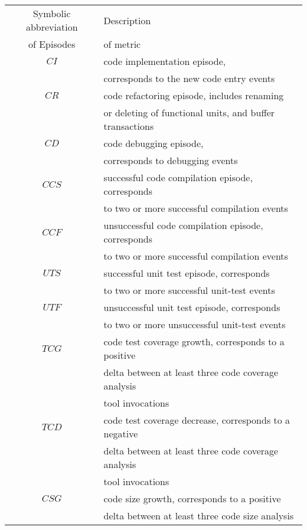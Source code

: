 \begin{table}
\begin{center}
    \begin{tabular}{ | c | l | }
    \hline
    Symbolic abbreviation 	& Description \\ 
    of Episodes 						& of metric	  \\ 
    \hline
    $CI$ 									& code implementation episode, \\ 
    											& corresponds to the new code entry events \\
	  \hline
    $CR$ 									& code refactoring episode, includes renaming \\
    											& or deleting of functional units, and buffer transactions \\
    \hline
    $CD$ 									& code debugging episode, \\
    											& corresponds to debugging events \\
		\hline
		$CCS$ 								& successful code compilation episode, corresponds \\
													& to two or more successful compilation events \\
		\hline
		$CCF$ 								& unsuccessful code compilation episode, corresponds \\
													& to two or more successful compilation events \\
    \hline
		$UTS$ 								& successful unit test episode, corresponds \\
													& to two or more successful unit-test events \\
		\hline
		$UTF$ 							  & unsuccessful unit test episode, corresponds \\
													& to two or more unsuccessful unit-test events \\
		\hline
		$TCG$ 								& code test coverage growth, corresponds to a positive \\
													& delta between at least three code coverage analysis \\
													& tool invocations \\
		\hline
		$TCD$ 								& code test coverage decrease, corresponds to a negative \\
													& delta between at least three code coverage analysis \\
													& tool invocations \\
		\hline
		$CSG$ 								& code size growth, corresponds to a positive \\
													& delta between at least three code size analysis \\

\end{tabular}
\end{center}
\end{table}
